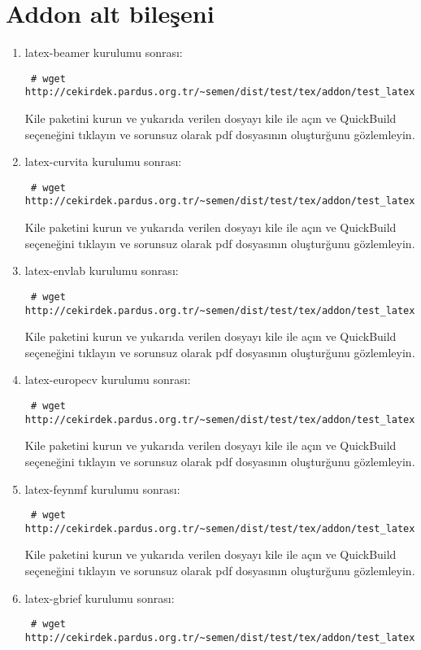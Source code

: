 \documentclass[a4paper,10pt]{article}
\begin{document}
\section{Addon alt bileşeni}
\begin{enumerate}
\item  latex-beamer kurulumu sonrası:
\begin{verbatim}
 # wget http://cekirdek.pardus.org.tr/~semen/dist/test/tex/addon/test_latexbeamer.tex
\end{verbatim}

Kile paketini kurun ve yukarıda verilen dosyayı kile ile açın ve QuickBuild  seçeneğini tıklayın ve sorunsuz olarak pdf dosyasının oluşturğunu gözlemleyin.
\item  latex-curvita kurulumu sonrası:
\begin{verbatim}
 # wget http://cekirdek.pardus.org.tr/~semen/dist/test/tex/addon/test_latexcurrvita.tex
\end{verbatim}

Kile paketini kurun ve yukarıda verilen dosyayı kile ile açın ve QuickBuild  seçeneğini tıklayın ve sorunsuz olarak pdf dosyasının oluşturğunu gözlemleyin.
\item  latex-envlab kurulumu sonrası:
\begin{verbatim}
 # wget http://cekirdek.pardus.org.tr/~semen/dist/test/tex/addon/test_latexenvlab.tex
\end{verbatim}

Kile paketini kurun ve yukarıda verilen dosyayı kile ile açın ve QuickBuild  seçeneğini tıklayın ve sorunsuz olarak pdf dosyasının oluşturğunu gözlemleyin.
\item  latex-europecv kurulumu sonrası:
\begin{verbatim}
 # wget http://cekirdek.pardus.org.tr/~semen/dist/test/tex/addon/test_latexeuropecv.tex
\end{verbatim}

Kile paketini kurun ve yukarıda verilen dosyayı kile ile açın ve QuickBuild  seçeneğini tıklayın ve sorunsuz olarak pdf dosyasının oluşturğunu gözlemleyin.
\item  latex-feynmf kurulumu sonrası:
\begin{verbatim}
 # wget http://cekirdek.pardus.org.tr/~semen/dist/test/tex/addon/test_latexfeynmf.tex
\end{verbatim}

Kile paketini kurun ve yukarıda verilen dosyayı kile ile açın ve QuickBuild  seçeneğini tıklayın ve sorunsuz olarak pdf dosyasının oluşturğunu gözlemleyin.
\item  latex-gbrief kurulumu sonrası:
\begin{verbatim}
 # wget http://cekirdek.pardus.org.tr/~semen/dist/test/tex/addon/test_latexgbrief.tex
\end{verbatim}


\end{enumerate}
\end{document}

